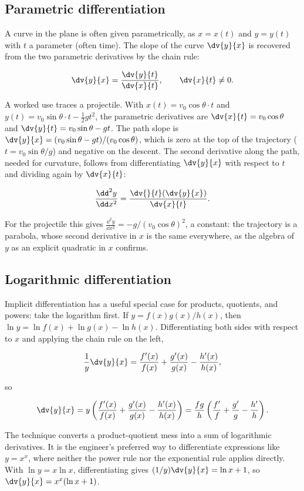 \subsection{Parametric differentiation}

A curve in the plane is often given parametrically, as $x = x(t)$
and $y = y(t)$ with $t$ a parameter (often time). The slope of the
curve $\dv{y}{x}$ is recovered from the two parametric derivatives
by the chain rule:

\[
\dv{y}{x} = \frac{\dv{y}{t}}{\dv{x}{t}}, \qquad \dv{x}{t} \neq 0.
\]

A worked use traces a projectile. With $x(t) = v_{0} \cos\theta
\cdot t$ and $y(t) = v_{0} \sin\theta \cdot t - \tfrac{1}{2} g
t^{2}$, the parametric derivatives are $\dv{x}{t} = v_{0}
\cos\theta$ and $\dv{y}{t} = v_{0} \sin\theta - g t$. The path
slope is $\dv{y}{x} = (v_{0} \sin\theta - g t)/(v_{0} \cos\theta)$,
which is zero at the top of the trajectory ($t = v_{0}
\sin\theta / g$) and negative on the descent. The second
derivative along the path, needed for curvature, follows from
differentiating $\dv{y}{x}$ with respect to $t$ and dividing again
by $\dv{x}{t}$:

\[
\frac{\dd^{2} y}{\dd x^{2}} = \frac{\dv{}{t}\!\left(\dv{y}{x}
\right)}{\dv{x}{t}}.
\]

For the projectile this gives $\frac{\dd^{2} y}{\dd x^{2}} = -g /
(v_{0} \cos\theta)^{2}$, a constant: the trajectory is a parabola,
whose second derivative in $x$ is the same everywhere, as the
algebra of $y$ as an explicit quadratic in $x$ confirms.

\subsection{Logarithmic differentiation}

Implicit differentiation has a useful special case for products,
quotients, and powers: take the logarithm first. If $y = f(x)
g(x) / h(x)$, then $\ln y = \ln f(x) + \ln g(x) - \ln h(x)$.
Differentiating both sides with respect to $x$ and applying the
chain rule on the left,

\[
\frac{1}{y} \dv{y}{x} = \frac{f'(x)}{f(x)} + \frac{g'(x)}{g(x)} -
\frac{h'(x)}{h(x)},
\]

so

\[
\dv{y}{x} = y \left(\frac{f'(x)}{f(x)} + \frac{g'(x)}{g(x)} -
\frac{h'(x)}{h(x)}\right) = \frac{f g}{h} \left(\frac{f'}{f} +
\frac{g'}{g} - \frac{h'}{h}\right).
\]

The technique converts a product-quotient mess into a sum of
logarithmic derivatives. It is the engineer's preferred way to
differentiate expressions like $y = x^{x}$, where neither the
power rule nor the exponential rule applies directly. With $\ln y
= x \ln x$, differentiating gives $(1/y) \dv{y}{x} = \ln x + 1$,
so $\dv{y}{x} = x^{x} (\ln x + 1)$.

